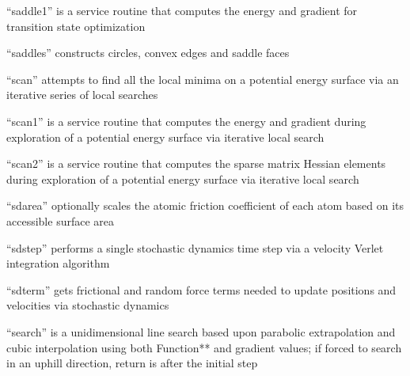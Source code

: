 \documentclass[letterpaper,11pt,english]{sphinxmanual}
\begin{document}
“saddle1” is a service routine that computes the energy and gradient for transition state optimization


“saddles” constructs circles, convex edges and saddle faces


“scan” attempts to find all the local minima on a potential energy surface via an iterative series of local searches


“scan1” is a service routine that computes the energy and gradient during exploration of a potential energy surface via iterative local search


“scan2” is a service routine that computes the sparse matrix Hessian elements during exploration of a potential energy surface via iterative local search


“sdarea” optionally scales the atomic friction coefficient of each atom based on its accessible surface area


“sdstep” performs a single stochastic dynamics time step via a velocity Verlet integration algorithm


“sdterm” gets frictional and random force terms needed to update positions and velocities via stochastic dynamics


“search” is a unidimensional line search based upon parabolic extrapolation and cubic interpolation using both Function** and gradient values; if forced to search in an uphill direction, return is after the initial step






\end{document}
